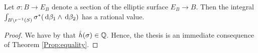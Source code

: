 \documentclass[a4paper,12pt]{article}
\theoremstyle{remark}
\newtheorem{note}[results]{Note}
\begin{document}
%
%
%
%

\begin{corollary}
	Let $\sigma:B \rightarrow E_B$ denote a section of the elliptic surface $E_B \rightarrow B$. Then the integral $\int_{B \setminus r^{-1}(S)} \sigma^*(\,\mathrm d \beta_1 \wedge \,\mathrm d \beta_2)$ has a rational value.
\end{corollary}
\begin{proof}
	We have by \cite[Section 11.8]{ellipticsurfaces} that $\hat{h}(\sigma) \in \mathbb Q$. Hence, the thesis is an immediate consequence of Theorem \ref{Prop:equality}.
\end{proof}
\end{document}
